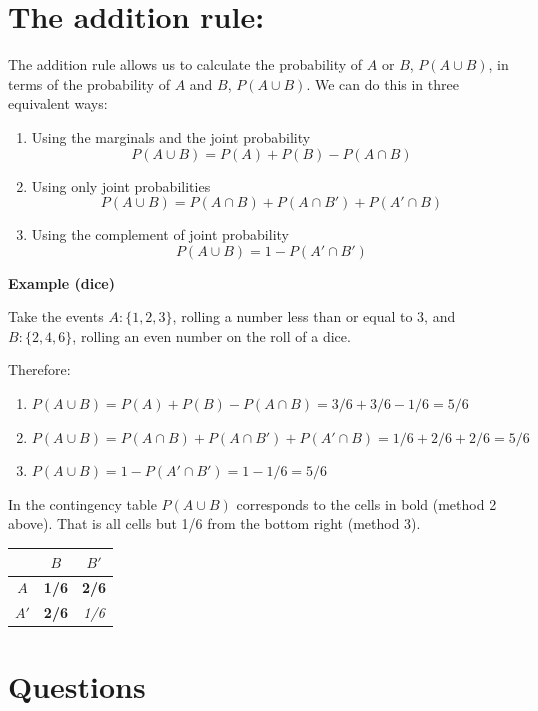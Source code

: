 \documentclass[
]{book}
\begin{document}
\hypertarget{the-addition-rule}{%
\section{The addition rule:}\label{the-addition-rule}}

The addition rule allows us to calculate the probability of \(A\) or \(B\), \(P( A \cup B)\), in terms of the probability of \(A\) and \(B\), \(P(A \cup B )\). We can do this in three equivalent ways:

\begin{enumerate}
\def\labelenumi{\arabic{enumi})}
\item
  Using the marginals and the joint probability
  \[P(A \cup B)=P(A) + P(B) - P(A\cap B)\]
\item
  Using only joint probabilities
  \[P( A \cup B)=P(A \cap B)+P(A\cap B')+P(A'\cap B)\]
\item
  Using the complement of joint probability
  \[P(A \cup B)=1-P(A'\cap B')\]
\end{enumerate}

\textbf{Example (dice)}

Take the events \(A:\{ 1,2,3\}\), rolling a number less than or equal to \(3\), and \(B:\{2,4,6\}\), rolling an even number on the roll of a dice.

Therefore:

\begin{enumerate}
\def\labelenumi{\arabic{enumi})}
\item
  \(P( A \cup B)=P(A) + P(B) - P(A\cap B)=3/6+3/6-1/6=5/6\)
\item
  \(P(A \cup B)=P(A \cap B)+P(A\cap B')+P(A'\cap B)=1/6+2/6+2/6=5/6\)
\item
  \(P(A \cup B)=1-P(A'\cap B')= 1-1/6=5/6\)
\end{enumerate}

In the contingency table \(P( A \cup B)\) corresponds to the cells in bold (method 2 above). That is all cells but 1/6 from the bottom right (method 3).

\begin{longtable}[]{@{}ccc@{}}
\toprule\noalign{}
& \(B\) & \(B'\) \\
\midrule\noalign{}
\endhead
\bottomrule\noalign{}
\endlastfoot
\(A\) & \textbf{1/6} & \textbf{2/6} \\
\(A'\) & \textbf{2/6} & \emph{1/6} \\
\end{longtable}

\hypertarget{questions-1}{%
\section{Questions}\label{questions-1}}
\end{document}
